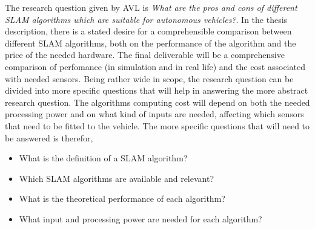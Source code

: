 The research question given by AVL is \textit{What are the pros and
cons of different SLAM algorithms which are suitable for autonomous vehicles?}.
In the thesis description, there is a stated desire for a comprehensible
comparison between different SLAM
algorithms, both on the performance of the algorithm and the price of the
needed hardware. The final deliverable will be a comprehensive comparison of
perfomance (in simulation and in real life) and the cost associated with needed
sensors. Being rather wide in scope, the research question can be divided into
more specific questions that will help in answering the more abstract research
question. The algorithms computing cost will depend on both the needed
processing power and
on what kind of inputs are needed, affecting which sensors that need to be
fitted to the vehicle. The more specific questions that will need to be answered is therefor, 
\begin{itemize}
    \item What is the definition of a SLAM algorithm?
    \item Which SLAM algorithms are available and relevant?
    \item What is the theoretical performance of each algorithm?
    \item What input and processing power are needed for each algorithm?
    \end{itemize}
